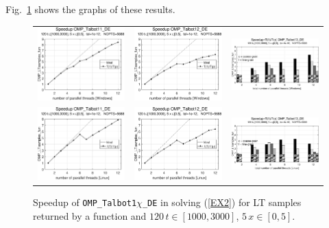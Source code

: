 \documentclass[a4paper,10pt]{report}%
\begin{document}
Fig.~\ref{PAR_EX2_speedup_fun} shows the graphs of these results.
\begin{figure}[htb]
\centering
\begin{tabular}{ccc} %
\includegraphics[height=0.2\textwidth]{./FIGS/EX2/EX2_fun_speedup_11_Windows.eps} &
\includegraphics[height=0.2\textwidth]{./FIGS/EX2/EX2_fun_speedup_12_Windows.eps} &
\includegraphics[height=0.2\textwidth,keepaspectratio=true]{./FIGS/EX2/EX2_fun_speedup_13_Windows.eps} \\
\includegraphics[height=0.2\textwidth]{./FIGS/EX2/EX2_fun_speedup_11_Linux.eps} &
\includegraphics[height=0.2\textwidth]{./FIGS/EX2/EX2_fun_speedup_12_Linux.eps} &
\includegraphics[height=0.2\textwidth,keepaspectratio=true]{./FIGS/EX2/EX2_fun_speedup_13_Linux.eps}
\end{tabular}
\caption{\small Speedup of {\tt OMP\_Talbot1$\chi$\_DE} in solving (\ref{EX2}) for LT samples returned
by a function and $120\,t\in[1000,3000]$, $5\,x\in[0,5]$.}
\label{PAR_EX2_speedup_fun}
\end{figure}
\end{document}
